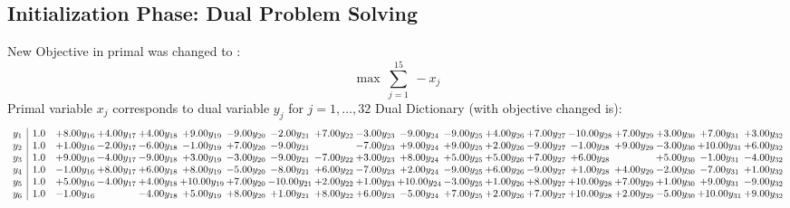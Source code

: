 \documentclass[9pt]{article}
\begin{document}
\subsection{Initialization Phase: Dual Problem Solving}
New Objective in primal was changed to : \[ \max\ \sum_{j=1}^{15}\ - x_j \] 
Primal variable $x_j$ corresponds to dual variable $y_j$ for $j = 1,\ldots,32$
Dual Dictionary (with objective changed is): 
\[\begin{array}{c| c c@{\hskip 2pt} c@{\hskip 2pt} c@{\hskip 2pt} c@{\hskip 2pt} c@{\hskip 2pt} c@{\hskip 2pt} c@{\hskip 2pt} c@{\hskip 2pt} c@{\hskip 2pt} c@{\hskip 2pt} c@{\hskip 2pt} c@{\hskip 2pt} c@{\hskip 2pt} c@{\hskip 2pt} c@{\hskip 2pt} c@{\hskip 2pt} c@{\hskip 2pt} }
 y_{1}   &  1.0 & +  8.00 y_{16} & +  4.00 y_{17} & +  4.00 y_{18} & +  9.00 y_{19} & -9.00 y_{20} & -2.00 y_{21} & +  7.00 y_{22} & -3.00 y_{23} & -9.00 y_{24} & -9.00 y_{25} & +  4.00 y_{26} & +  7.00 y_{27} & -10.00 y_{28} & +  7.00 y_{29} & +  3.00 y_{30} & +  7.00 y_{31} & +  3.00 y_{32}\\
 y_{2}   &  1.0 & +  1.00 y_{16} & -2.00 y_{17} & -6.00 y_{18} & -1.00 y_{19} & +  7.00 y_{20} & -9.00 y_{21} &   & -7.00 y_{23} & +  9.00 y_{24} & +  9.00 y_{25} & +  2.00 y_{26} & -9.00 y_{27} & -1.00 y_{28} & +  9.00 y_{29} & -3.00 y_{30} & + 10.00 y_{31} & +  6.00 y_{32}\\
 y_{3}   &  1.0 & +  9.00 y_{16} & -4.00 y_{17} & -9.00 y_{18} & +  3.00 y_{19} & -3.00 y_{20} & -9.00 y_{21} & -7.00 y_{22} & +  3.00 y_{23} & +  8.00 y_{24} & +  5.00 y_{25} & +  5.00 y_{26} & +  7.00 y_{27} & +  6.00 y_{28} &   & +  5.00 y_{30} & -1.00 y_{31} & -4.00 y_{32}\\
 y_{4}   &  1.0 & -1.00 y_{16} & +  8.00 y_{17} & +  6.00 y_{18} & +  8.00 y_{19} & -5.00 y_{20} & -8.00 y_{21} & +  6.00 y_{22} & -7.00 y_{23} & +  2.00 y_{24} & -9.00 y_{25} & +  6.00 y_{26} & -9.00 y_{27} & +  1.00 y_{28} & +  4.00 y_{29} & -2.00 y_{30} & -7.00 y_{31} & +  1.00 y_{32}\\
 y_{5}   &  1.0 & +  5.00 y_{16} & -4.00 y_{17} & +  4.00 y_{18} & + 10.00 y_{19} & +  7.00 y_{20} & -10.00 y_{21} & +  2.00 y_{22} & +  1.00 y_{23} & + 10.00 y_{24} & -3.00 y_{25} & +  1.00 y_{26} & +  8.00 y_{27} & + 10.00 y_{28} & +  7.00 y_{29} & +  1.00 y_{30} & +  9.00 y_{31} & -9.00 y_{32}\\
 y_{6}   &  1.0 & -1.00 y_{16} &   & -4.00 y_{18} & +  5.00 y_{19} & +  8.00 y_{20} & +  1.00 y_{21} & +  8.00 y_{22} & +  6.00 y_{23} & -5.00 y_{24} & +  7.00 y_{25} & +  2.00 y_{26} & +  7.00 y_{27} & + 10.00 y_{28} & +  2.00 y_{29} & -5.00 y_{30} & + 10.00 y_{31} & +  9.00 y_{32}\\

\end{array}\]
\end{document}
